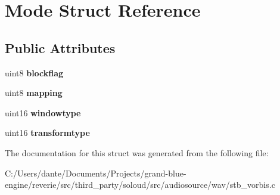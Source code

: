 \hypertarget{struct_mode}{}\section{Mode Struct Reference}
\label{struct_mode}
\subsection*{Public Attributes}
\begin{DoxyCompactItemize}
\item 
\mbox{\label{struct_mode_abc3023110a01eb21ac915398246c5868}} 
uint8 {\bfseries blockflag}
\item 
\mbox{\label{struct_mode_a56d2ce10834c4f563f402359db99af9f}} 
uint8 {\bfseries mapping}
\item 
\mbox{\label{struct_mode_a000084125ae3760f66182ab4adae705e}} 
uint16 {\bfseries windowtype}
\item 
\mbox{\label{struct_mode_a2f78100869ebed55b17f89e6a0202aac}} 
uint16 {\bfseries transformtype}
\end{DoxyCompactItemize}


The documentation for this struct was generated from the following file\+:\begin{DoxyCompactItemize}
\item 
C\+:/\+Users/dante/\+Documents/\+Projects/grand-\/blue-\/engine/reverie/src/third\+\_\+party/soloud/src/audiosource/wav/stb\+\_\+vorbis.\+c\end{DoxyCompactItemize}
